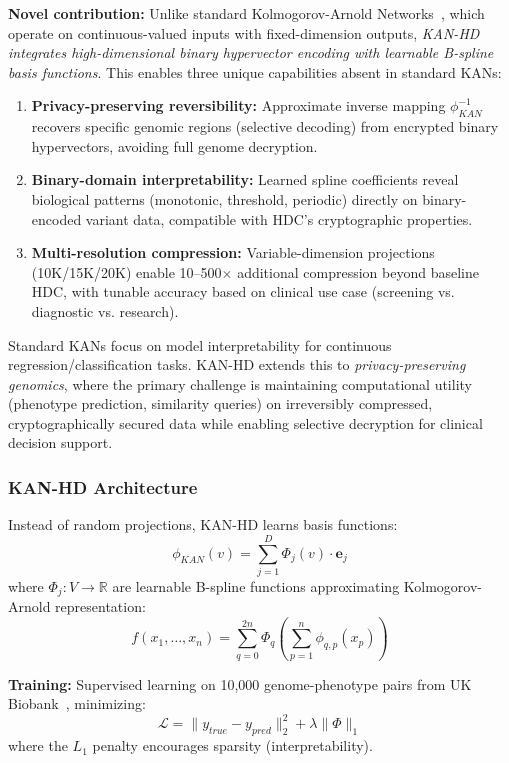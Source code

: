 \documentclass[12pt,a4paper]{article}
\begin{document}
\textbf{Novel contribution:} Unlike standard Kolmogorov-Arnold Networks~\cite{Liu2024}, which operate on continuous-valued inputs with fixed-dimension outputs, \textit{KAN-HD integrates high-dimensional binary hypervector encoding with learnable B-spline basis functions}. This enables three unique capabilities absent in standard KANs:
\begin{enumerate}
\item \textbf{Privacy-preserving reversibility:} Approximate inverse mapping $\phi_{KAN}^{-1}$ recovers specific genomic regions (selective decoding) from encrypted binary hypervectors, avoiding full genome decryption.
\item \textbf{Binary-domain interpretability:} Learned spline coefficients reveal biological patterns (monotonic, threshold, periodic) directly on binary-encoded variant data, compatible with HDC's cryptographic properties.
\item \textbf{Multi-resolution compression:} Variable-dimension projections (10K/15K/20K) enable 10--500$\times$ additional compression beyond baseline HDC, with tunable accuracy based on clinical use case (screening vs. diagnostic vs. research).
\end{enumerate}

Standard KANs focus on model interpretability for continuous regression/classification tasks. KAN-HD extends this to \textit{privacy-preserving genomics}, where the primary challenge is maintaining computational utility (phenotype prediction, similarity queries) on irreversibly compressed, cryptographically secured data while enabling selective decryption for clinical decision support.

\subsubsection{KAN-HD Architecture}

Instead of random projections, KAN-HD learns basis functions:
\[
\phi_{KAN}(v) = \sum_{j=1}^{D} \Phi_j(v) \cdot \mathbf{e}_j
\]
where $\Phi_j: V \to \mathbb{R}$ are learnable B-spline functions approximating Kolmogorov-Arnold representation:
\[
f(x_1, \ldots, x_n) = \sum_{q=0}^{2n} \Phi_q\left(\sum_{p=1}^n \phi_{q,p}(x_p)\right)
\]

\textbf{Training:} Supervised learning on 10,000 genome-phenotype pairs from UK Biobank~\cite{Sudlow2015}, minimizing:
\[
\mathcal{L} = \|y_{true} - y_{pred}\|_2^2 + \lambda \|\Phi\|_1
\]
where the $L_1$ penalty encourages sparsity (interpretability).
\end{document}
